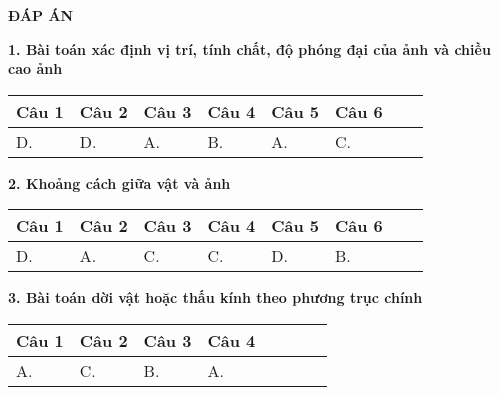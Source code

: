 \begin{center}
	\textbf{ĐÁP ÁN}
	
\end{center}

\textbf{1. Bài toán xác định vị trí, tính chất, độ phóng đại của ảnh và chiều cao ảnh}
\begin{longtable}[\textwidth]{|p{}|p{}|p{}|p{}|p{}|p{}|p{}|p{}|}
	\hline%
	\multicolumn{1}{|c|}{\textbf{Câu 1}} & \multicolumn{1}{c|}{\textbf{Câu 2}} & \multicolumn{1}{c|}{\textbf{Câu 3}} &
	\multicolumn{1}{c|}{\textbf{Câu 4}} &
	\multicolumn{1}{c|}{\textbf{Câu 5}} &
	\multicolumn{1}{c|}{\textbf{Câu 6}} &
	\multicolumn{1}{c|}{\textbf{}} &
	\multicolumn{1}{c|}{\textbf{}}\\
	\hline
	D.&D. &A. &B. &A. &C. & &	\\
	\hline
	
	
	
\end{longtable}

\textbf{2. Khoảng cách giữa vật và ảnh}

\begin{longtable}[\textwidth]{|p{}|p{}|p{}|p{}|p{}|p{}|p{}|p{}|}
	\hline%
	\multicolumn{1}{|c|}{\textbf{Câu 1}} & \multicolumn{1}{c|}{\textbf{Câu 2}} & \multicolumn{1}{c|}{\textbf{Câu 3}} &
	\multicolumn{1}{c|}{\textbf{Câu 4}} &
	\multicolumn{1}{c|}{\textbf{Câu 5}} &
	\multicolumn{1}{c|}{\textbf{Câu 6}} &
	\multicolumn{1}{c|}{\textbf{}} &
	\multicolumn{1}{c|}{\textbf{}}\\
	\hline
	D.&A. &C. &C. &D. &B. & &	\\
	\hline
	
	
	
\end{longtable}


\textbf{3. Bài toán dời vật hoặc thấu kính theo phương trục chính}

\begin{longtable}[\textwidth]{|p{}|p{}|p{}|p{}|p{}|p{}|p{}|p{}|}
	\hline%
	\multicolumn{1}{|c|}{\textbf{Câu 1}} & \multicolumn{1}{c|}{\textbf{Câu 2}} & \multicolumn{1}{c|}{\textbf{Câu 3}} &
	\multicolumn{1}{c|}{\textbf{Câu 4}} &
	\multicolumn{1}{c|}{\textbf{}} &
	\multicolumn{1}{c|}{\textbf{}} &
	\multicolumn{1}{c|}{\textbf{}} &
	\multicolumn{1}{c|}{\textbf{}}\\
	\hline
	A.&C. &B. &A. & & & &	\\
	\hline
	
	
	
\end{longtable}










